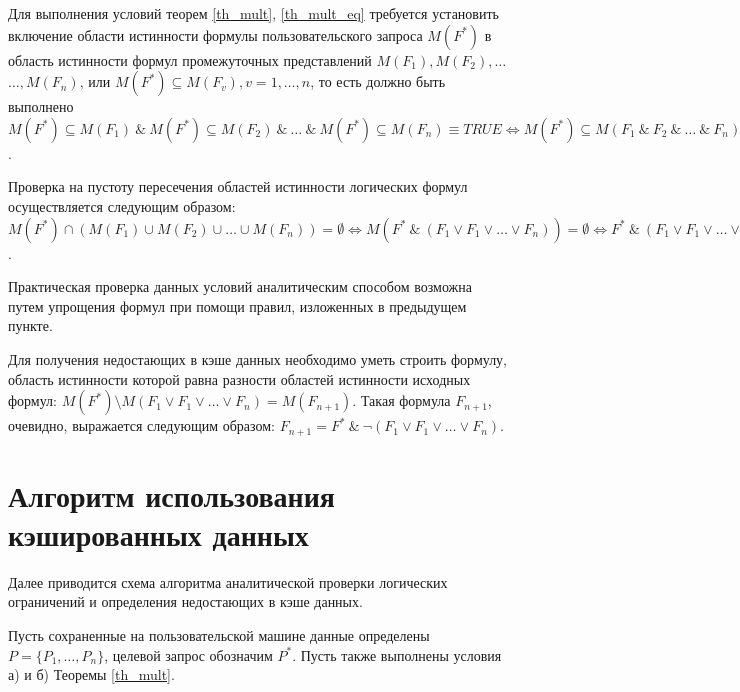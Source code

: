 \documentclass[10pt,a4paper]{article}
\def \n #1{\mathit{#1}}
\begin{document}
Для выполнения условий теорем \ref{th_mult}, \ref{th_mult_eq} требуется установить включение области
истинности формулы пользовательского запроса $M(F^{\ast})$ в область истинности формул промежуточных представлений $M(F_1), M(F_2), \dots$\\
$\dots, M(F_n)$, или $M(F^{\ast}) \subseteq M(F_{v}),
v = 1,\dots, n$, то есть должно быть выполнено $M(F^{\ast}) \subseteq M(F_1)\ \&\ M(F^{\ast}) \subseteq M(F_2)\ \&\ \dots\ \&\ M(F^{\ast}) \subseteq M(F_n) \equiv \n{TRUE} \iff M(F^{\ast}) \subseteq M(F_1\ \&\ F_2\ \&\ \dots\ \&\ F_n) \equiv \n{TRUE} \iff F^{\ast} \rightarrow F_1\ \&\ F_2\ \&\ \dots\ \&\ F_n \equiv \n{TRUE} \iff F_1\ \&\ F_2\ \&\ \dots \&\ F_n \vee \neg F^{\ast} \equiv
\n{TRUE} $.

Проверка на пустоту пересечения областей истинности логических формул осуществляется следующим образом: $M(F^{\ast}) \cap (M(F_1) \cup M(F_2) \cup \dots \cup M(F_n)) = \emptyset \iff M(F^{\ast}\ \&\ (F_1 \vee F_1 \vee \dots \vee F_n)) = \emptyset \iff
F^{\ast}\ \&\ (F_1 \vee F_1 \vee \dots \vee F_n) \equiv \n{FALSE}$.

Практическая проверка данных условий аналитическим способом возможна путем упрощения формул при
помощи правил, изложенных в предыдущем пункте.

Для получения недостающих в кэше данных необходимо уметь строить формулу, область истинности которой
равна разности областей истинности исходных формул:
$M(F^{\ast}) \setminus M(F_1 \vee F_1 \vee \dots \vee F_n) = M(F_{n + 1})$.
Такая формула $F_{n + 1}$, очевидно, выражается следующим образом: $F_{n + 1} = F^{\ast}\ \&\ \neg(F_1 \vee F_1 \vee \dots \vee F_n)$.


\section{Алгоритм использования кэшированных данных}
Далее приводится схема алгоритма аналитической проверки логических ограничений и определения
недостающих в кэше данных.

Пусть сохраненные на пользовательской машине данные определены $P = \{P_1,
\dots, P_n\}$, целевой запрос обозначим $P^{\ast}$. Пусть также выполнены условия а) и б) Теоремы \ref{th_mult}.
\end{document}

